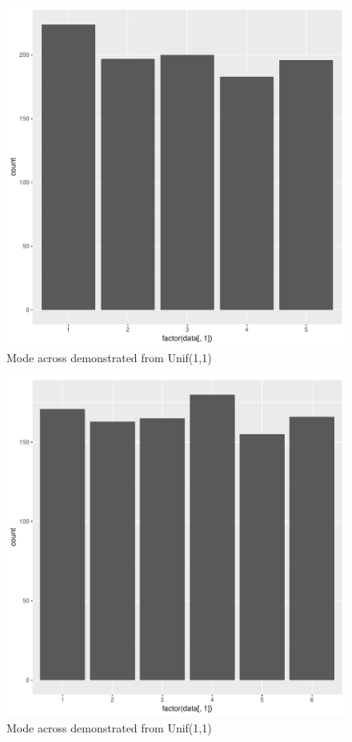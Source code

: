 \documentclass[11pt]{article}
\begin{document}
\begin{enumerate}
\begin{enumerate}
\begin{figure}[H]
	\end{figure}
	\begin{figure}[H]
		\centering
		\caption{Mode across demonstrated from Unif(1,1)}
		\includegraphics[scale=.4]{6graph.pdf}
	\end{figure}
	\begin{figure}[H]
		\centering
		\caption{Mode across demonstrated from Unif(1,1)}
		\includegraphics[scale=.4]{7graph.pdf}

\end{figure}
\end{enumerate}
\end{enumerate}
\end{document}
